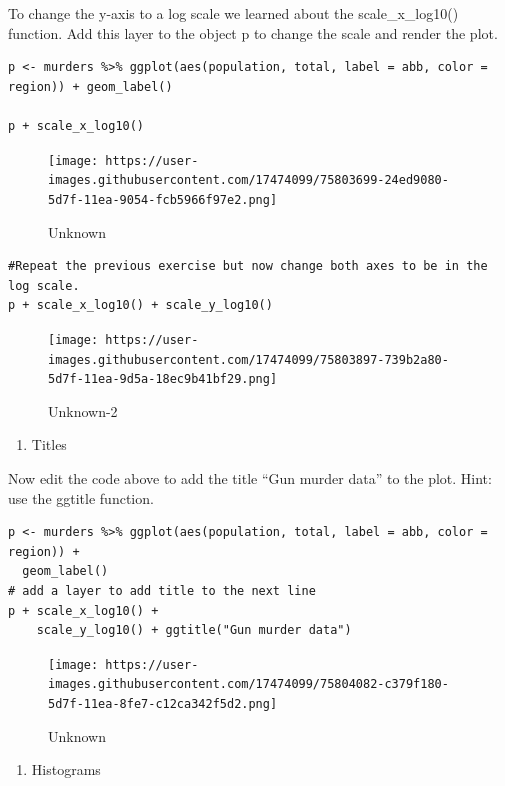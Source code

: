 \documentclass[
]{article}
\providecommand{\tightlist}{%
  \setlength{\itemsep}{0pt}\setlength{\parskip}{0pt}}
\begin{document}
To change the y-axis to a log scale we learned about the
scale\_x\_log10() function. Add this layer to the object p to change the
scale and render the plot.

\begin{verbatim}
p <- murders %>% ggplot(aes(population, total, label = abb, color = region)) + geom_label()

p + scale_x_log10()
\end{verbatim}

\begin{figure}
\centering
\texttt{[image: https://user-images.githubusercontent.com/17474099/75803699-24ed9080-5d7f-11ea-9054-fcb5966f97e2.png]}
\caption{Unknown}
\end{figure}

\begin{verbatim}
#Repeat the previous exercise but now change both axes to be in the log scale.
p + scale_x_log10() + scale_y_log10()
\end{verbatim}

\begin{figure}
\centering
\texttt{[image: https://user-images.githubusercontent.com/17474099/75803897-739b2a80-5d7f-11ea-9d5a-18ec9b41bf29.png]}
\caption{Unknown-2}
\end{figure}

\begin{enumerate}
\def\labelenumi{\arabic{enumi}.}
\setcounter{enumi}{13}
\tightlist
\item
  Titles
\end{enumerate}

Now edit the code above to add the title ``Gun murder data'' to the
plot. Hint: use the ggtitle function.

\begin{verbatim}
p <- murders %>% ggplot(aes(population, total, label = abb, color = region)) +
  geom_label()
# add a layer to add title to the next line
p + scale_x_log10() + 
    scale_y_log10() + ggtitle("Gun murder data")
\end{verbatim}

\begin{figure}
\centering
\texttt{[image: https://user-images.githubusercontent.com/17474099/75804082-c379f180-5d7f-11ea-8fe7-c12ca342f5d2.png]}
\caption{Unknown}
\end{figure}

\begin{enumerate}
\def\labelenumi{\arabic{enumi}.}
\setcounter{enumi}{14}
\tightlist
\item
  Histograms
\end{enumerate}
\end{document}
